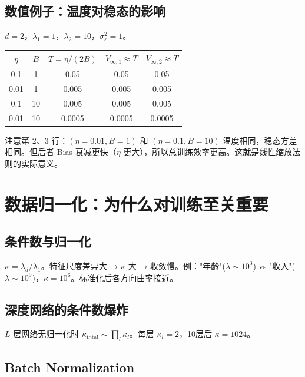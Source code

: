 \documentclass[12pt, a4paper]{ctexart}
\begin{document}
\subsection{数值例子：温度对稳态的影响}

$d = 2$，$\lambda_1 = 1$，$\lambda_2 = 10$，$\sigma_\varepsilon^2 = 1$。

\begin{center}
\begin{tabular}{cc|c|cc}
$\eta$ & $B$ & $T = \eta/(2B)$ & $V_{\infty,1} \approx T$ & $V_{\infty,2} \approx T$ \\
\hline
0.1 & 1 & 0.05 & 0.05 & 0.05 \\
0.01 & 1 & 0.005 & 0.005 & 0.005 \\
0.1 & 10 & 0.005 & 0.005 & 0.005 \\
0.01 & 10 & 0.0005 & 0.0005 & 0.0005 \\
\end{tabular}
\end{center}

注意第 2、3 行：$(\eta=0.01, B=1)$ 和 $(\eta=0.1, B=10)$ 温度相同，稳态方差相同。但后者 Bias 衰减更快（$\eta$ 更大），所以总训练效率更高。这就是线性缩放法则的实际意义。


\section{数据归一化：为什么对训练至关重要}

\subsection{条件数与归一化}

$\kappa = \lambda_d/\lambda_1$。特征尺度差异大 → $\kappa$ 大 → 收敛慢。例："年龄"($\lambda\sim 10^3$) vs "收入"($\lambda\sim 10^9$)，$\kappa = 10^6$。标准化后各方向曲率接近。

\subsection{深度网络的条件数爆炸}

$L$ 层网络无归一化时 $\kappa_{\text{total}} \sim \prod_l \kappa_l$。每层 $\kappa_l = 2$，10层后 $\kappa = 1024$。

\subsection{Batch Normalization}
\end{document}
